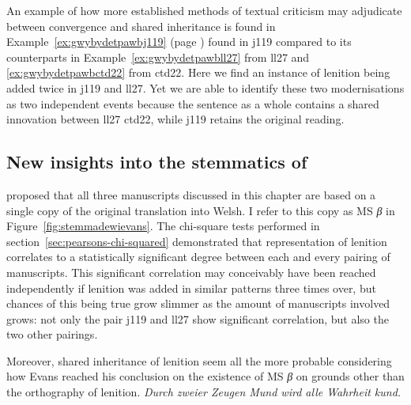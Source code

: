 An example of how more established methods of textual criticism may adjudicate between convergence and shared inheritance is  found in Example~\ref{ex:gwybydetpawbj119} (page \pageref{ex:gwybydetpawbj119}) found in \gls{j119} compared to its counterparts in Example~\ref{ex:gwybydetpawbll27} from \gls{ll27} and \ref{ex:gwybydetpawbctd22} from \gls{ctd22}. Here we find an instance of lenition being added twice in \gls{j119} and \gls{ll27}. Yet we are able to identify these two modernisations as two independent events  because the sentence as a whole contains a shared innovation between \gls{ll27} \gls{ctd22}, while \gls{j119} retains the original reading. 


\subsection{New insights into the stemmatics of }
\label{sec:new-insights-into}

\Textcite{[lviii]Eva_Welsh88} proposed that all three manuscripts discussed in this chapter are based on a single copy of the original translation into Welsh. I refer to this copy as MS \textit{β} in Figure~\ref{fig:stemmadewievans}. The chi-square tests performed in section~\ref{sec:pearsons-chi-squared} demonstrated that representation of lenition correlates to a statistically significant degree between each and every pairing of manuscripts. This significant correlation may conceivably have been reached independently if lenition was added in similar patterns three times over, but chances of this being true grow slimmer as the amount of manuscripts involved grows: not only the pair \gls{j119} and \gls{ll27} show significant correlation, but also the two other pairings. 

Moreover, shared inheritance of lenition seem all the more probable considering how Evans reached his conclusion on the existence of MS \textit{β} on grounds other than the orthography of lenition. \emph{Durch zweier Zeugen Mund wird alle Wahrheit kund.}






